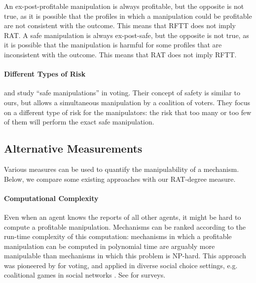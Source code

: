 An ex-post-profitable manipulation is always profitable, but the opposite is not true, as it is possible that the profiles in which a manipulation could be profitable are not consistent with the outcome. This means that RFTT does not imply RAT.
%
A safe manipulation is always ex-post-safe, but the opposite is not true, as it is possible that the manipulation is harmful for some profiles that are inconsistent with the outcome. This means that RAT does not imply RFTT.



\paragraph{Different Types of Risk}
\citet{slinko2008nondictatorial,slinko2014ever} and \citet{hazon2010complexity} study ``safe manipulations'' in voting. Their concept of safety is similar to ours, but allows a simultaneous manipulation by a coalition of voters. They focus on a different type of risk for the manipulators: the risk that too many or too few of them will perform the exact safe manipulation.

\subsection{Alternative Measurements}
Various measures can be used to quantify the manipulability of a mechanism. Below, we compare some existing approaches with our RAT-degree measure.

\paragraph{Computational Complexity}
Even when an agent knows the reports of all other agents, it might be hard to compute a profitable manipulation. 
Mechanisms can be ranked according to the run-time complexity of this computation: mechanisms in which a profitable manipulation can be computed in polynomial time are arguably more manipulable than mechanisms in which this problem is NP-hard. 
This approach was pioneered by \citet{bartholdi1989computational,bartholdi1991single} for voting, and applied in diverse social choice settings, e.g. coalitional games in social networks \citep{waxman2021manipulation}. See \citet{faliszewski2010ai,veselova2016computational} for surveys.

